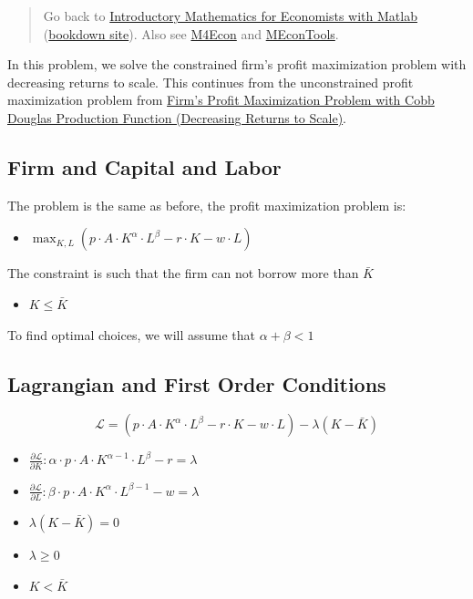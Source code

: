 \documentclass[
]{book}
\providecommand{\tightlist}{%
  \setlength{\itemsep}{0pt}\setlength{\parskip}{0pt}}
\begin{document}
\begin{quote}
Go back to \href{https://math4econ.github.io/}{Introductory Mathematics for Economists with Matlab} (\href{https://math4econ.github.io/bookdown}{bookdown site}). Also see \href{http://fanwangecon.github.io/M4Econ}{M4Econ} and \href{https://fanwangecon.github.io/MEconTools/}{MEconTools}.
\end{quote}

In this problem, we solve the constrained firm's profit maximization
problem with decreasing returns to scale. This continues from the
unconstrained profit maximization problem from \href{https://math4econ.github.io/matrix_application/KL_borrowhire_firm.html}{Firm's Profit
Maximization Problem with Cobb Douglas Production Function (Decreasing
Returns to
Scale)}.

\hypertarget{firm-and-capital-and-labor-1}{%
\subsection{Firm and Capital and Labor}\label{firm-and-capital-and-labor-1}}

The problem is the same as before, the profit maximization problem is:

\begin{itemize}
\tightlist
\item
  \(\displaystyle \max_{K,L} \left(p\cdot A\cdot K^{\alpha } \cdot L^{\beta } -r\cdot K-w\cdot L\right)\)
\end{itemize}

The constraint is such that the firm can not borrow more than \(\bar{K}\)

\begin{itemize}
\tightlist
\item
  \(\displaystyle K\le \bar{K}\)
\end{itemize}

To find optimal choices, we will assume that \(\alpha +\beta <1\)

\hypertarget{lagrangian-and-first-order-conditions}{%
\subsection{Lagrangian and First Order Conditions}\label{lagrangian-and-first-order-conditions}}

\[\mathcal{L}=\left(p\cdot A\cdot K^{\alpha } \cdot L^{\beta } -r\cdot K-w\cdot L\right)-\lambda \left(K-\bar{K} \right)\]

\begin{itemize}
\item
  \(\displaystyle \frac{\partial \mathcal{L}}{\partial K}:\alpha \cdot p\cdot A\cdot K^{\alpha -1} \cdot L^{\beta } -r=\lambda\)
\item
  \(\displaystyle \frac{\partial \mathcal{L}}{\partial L}:\beta \cdot p\cdot A\cdot K^{\alpha } \cdot L^{\beta -1} -w=\lambda\)
\item
  \(\displaystyle \lambda \left(K-\bar{K} \right)=0\)
\item
  \(\displaystyle \lambda \ge 0\)
\item
  \(\displaystyle K<\bar{K}\)
\end{itemize}
\end{document}
